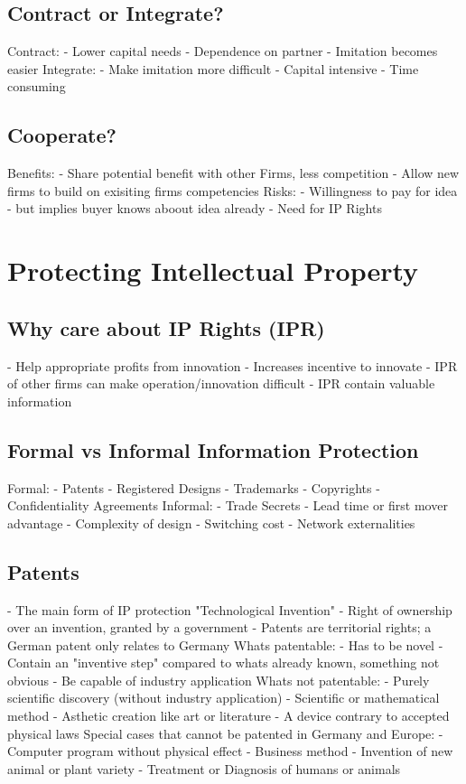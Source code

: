 \documentclass{scrartcl}
\begin{document}
\subsection*{Contract or Integrate?}
Contract:
- Lower capital needs
- Dependence on partner
- Imitation becomes easier
Integrate:
- Make imitation more difficult
- Capital intensive
- Time consuming
\subsection*{Cooperate?}
Benefits:
- Share potential benefit with other Firms, less competition
- Allow new firms to build on exisiting firms competencies
Risks:
- Willingness to pay for idea - but implies buyer knows aboout idea already
- Need for IP Rights

\section*{Protecting Intellectual Property}
\subsection*{Why care about IP Rights (IPR)}
- Help appropriate profits from innovation
- Increases incentive to innovate
- IPR of other firms can make operation/innovation difficult
- IPR contain valuable information
\subsection*{Formal vs Informal Information Protection}
Formal:
- Patents
- Registered Designs
- Trademarks
- Copyrights
- Confidentiality Agreements
Informal:
- Trade Secrets
- Lead time or first mover advantage
- Complexity of design
- Switching cost
- Network externalities
\subsection*{Patents}
- The main form of IP protection "Technological Invention"
- Right of ownership over an invention, granted by a government
- Patents are territorial rights; a German patent only relates to Germany
Whats patentable:
- Has to be novel
- Contain an "inventive step" compared to whats already known, something not obvious
- Be capable of industry application
Whats not patentable:
- Purely scientific discovery (without industry application)
- Scientific or mathematical method
- Asthetic creation like art or literature
- A device contrary to accepted physical laws
Special cases that cannot be patented in Germany and Europe:
- Computer program without physical effect
- Business method
- Invention of new animal or plant variety
- Treatment or Diagnosis of humans or animals
\end{document}
